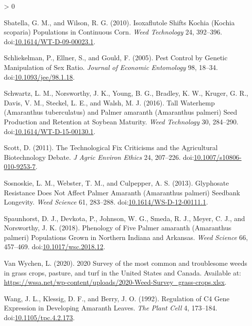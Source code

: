 \documentclass[utf8]{frontiersSCNS}
\newlength{\cslhangindent}
\newenvironment{CSLReferences}[2] %
 {%
  \setlength{\parindent}{0pt}
  \ifodd #1 \everypar{\setlength{\hangindent}{\cslhangindent}}\ignorespaces\fi
  \ifnum #2 > 0
  \setlength{\parskip}{#2\baselineskip}
  \fi
 }%
 {}
\begin{document}
\begin{CSLReferences}{1}{0}
\leavevmode\hypertarget{ref-sbatella2010}{}%
Sbatella, G. M., and Wilson, R. G. (2010). Isoxaflutole {Shifts Kochia}
({Kochia} scoparia) {Populations} in {Continuous Corn}. \emph{Weed
Technology} 24, 392--396.
doi:\href{https://doi.org/10.1614/WT-D-09-00023.1}{10.1614/WT-D-09-00023.1}.

\leavevmode\hypertarget{ref-schliekelman2005}{}%
Schliekelman, P., Ellner, S., and Gould, F. (2005). Pest {Control} by
{Genetic Manipulation} of {Sex Ratio}. \emph{Journal of Economic
Entomology} 98, 18--34.
doi:\href{https://doi.org/10.1093/jee/98.1.18}{10.1093/jee/98.1.18}.

\leavevmode\hypertarget{ref-schwartz2016}{}%
Schwartz, L. M., Norsworthy, J. K., Young, B. G., Bradley, K. W.,
Kruger, G. R., Davis, V. M., Steckel, L. E., and Walsh, M. J. (2016).
Tall {Waterhemp} ({Amaranthus} tuberculatus) and {Palmer} amaranth
({Amaranthus} palmeri) {Seed Production} and {Retention} at {Soybean
Maturity}. \emph{Weed Technology} 30, 284--290.
doi:\href{https://doi.org/10.1614/WT-D-15-00130.1}{10.1614/WT-D-15-00130.1}.

\leavevmode\hypertarget{ref-scott2011}{}%
Scott, D. (2011). The {Technological Fix Criticisms} and the
{Agricultural Biotechnology Debate}. \emph{J Agric Environ Ethics} 24,
207--226.
doi:\href{https://doi.org/10.1007/s10806-010-9253-7}{10.1007/s10806-010-9253-7}.

\leavevmode\hypertarget{ref-sosnoskie2013}{}%
Sosnoskie, L. M., Webster, T. M., and Culpepper, A. S. (2013).
Glyphosate {Resistance Does Not Affect Palmer Amaranth} ({Amaranthus}
palmeri) {Seedbank Longevity}. \emph{Weed Science} 61, 283--288.
doi:\href{https://doi.org/10.1614/WS-D-12-00111.1}{10.1614/WS-D-12-00111.1}.

\leavevmode\hypertarget{ref-spaunhorst2018}{}%
Spaunhorst, D. J., Devkota, P., Johnson, W. G., Smeda, R. J., Meyer, C.
J., and Norsworthy, J. K. (2018). Phenology of {Five Palmer} amaranth
({Amaranthus} palmeri) {Populations Grown} in {Northern Indiana} and
{Arkansas}. \emph{Weed Science} 66, 457--469.
doi:\href{https://doi.org/10.1017/wsc.2018.12}{10.1017/wsc.2018.12}.

\leavevmode\hypertarget{ref-vanwychen2020}{}%
Van Wychen, L. (2020). 2020 {Survey} of the most common and troublesome
weeds in grass crops, pasture, and turf in the {United States} and
{Canada}. Available at:
\url{https://wssa.net/wp-content/uploads/2020-Weed-Survey_grass-crops.xlsx}.

\leavevmode\hypertarget{ref-wang1992}{}%
Wang, J. L., Klessig, D. F., and Berry, J. O. (1992). Regulation of {C4
Gene Expression} in {Developing Amaranth Leaves}. \emph{The Plant Cell}
4, 173--184.
doi:\href{https://doi.org/10.1105/tpc.4.2.173}{10.1105/tpc.4.2.173}.


\end{CSLReferences}
\end{document}
